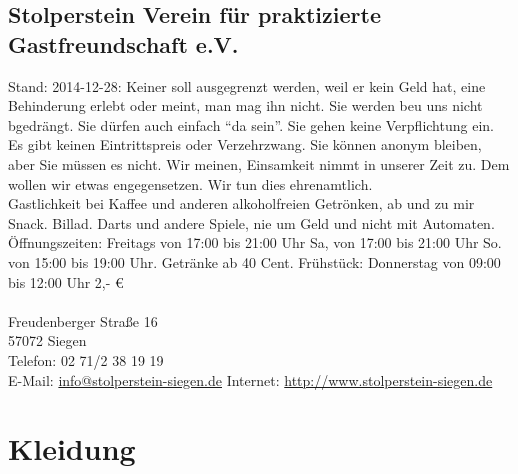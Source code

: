 \documentclass[11pt,fleqn]{book} %
\begin{document}
\section{Stolperstein Verein für praktizierte Gastfreundschaft e.V.}
Stand: 2014-12-28: Keiner soll ausgegrenzt werden, weil er kein Geld hat, eine Behinderung erlebt oder meint, man mag ihn nicht. Sie werden beu uns nicht bgedrängt. Sie dürfen auch einfach \enquote{da sein}. Sie gehen keine Verpflichtung ein. Es gibt keinen Eintrittspreis oder Verzehrzwang. Sie können anonym bleiben, aber Sie müssen es nicht. Wir meinen, Einsamkeit nimmt in unserer Zeit zu. Dem wollen wir etwas engegensetzen. Wir tun dies ehrenamtlich.\\
Gastlichkeit bei Kaffee und anderen alkoholfreien Getrönken, ab und zu mir Snack. Billad. Darts und andere Spiele, nie um Geld und nicht mit Automaten.\\
Öffnungszeiten: Freitags von 17:00 bis 21:00 Uhr Sa, von  17:00 bis 21:00 Uhr So. von 15:00 bis 19:00 Uhr. Getränke ab 40 Cent. Frühstück: Donnerstag von 09:00 bis 12:00 Uhr 2,- \euro \\
\\
Freudenberger Straße 16\\
57072 Siegen\\
Telefon: 02 71/2 38 19 19\\
E-Mail: \href{mailto:info@stolperstein-siegen.de}{info@stolperstein-siegen.de}
Internet: \href{http://www.stolperstein-siegen.de}{http://www.stolperstein-siegen.de} 


\chapter{Kleidung}
\end{document}
